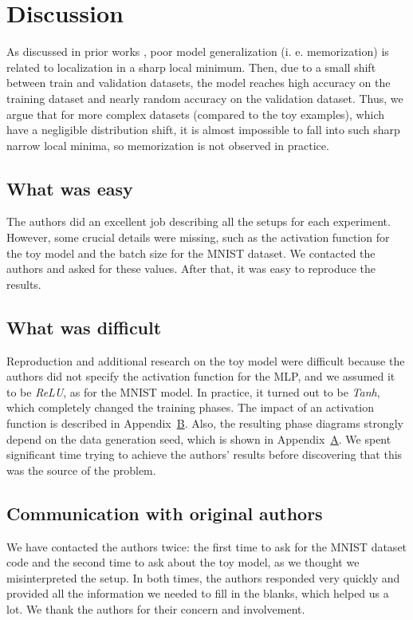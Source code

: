 \section{Discussion}

As discussed in prior works \cite{sharp_minima, entropy_sgd}, poor model generalization (i. e. memorization) is related to localization in a sharp local minimum. Then, due to a small shift between train and validation datasets, the model reaches high accuracy on the training dataset and nearly random accuracy on the validation dataset. Thus, we argue that for more complex datasets (compared to the toy examples), which have a negligible distribution shift, it is almost impossible to fall into such sharp narrow local minima, so memorization is not observed in practice.

\subsection{What was easy}

The authors did an excellent job describing all the setups for each experiment. However, some crucial details were missing, such as the activation function for the toy model and the batch size for the MNIST dataset. We contacted the authors and asked for these values. After that, it was easy to reproduce the results.

\subsection{What was difficult}

Reproduction and additional research on the toy model were difficult because the authors did not specify the activation function for the MLP, and we assumed it to be \emph{ReLU}, as for the MNIST model. In practice, it turned out to be \emph{Tanh}, which completely changed the training phases. The impact of an activation function is described in Appendix~\hyperref[app:B]{B}. Also, the resulting phase diagrams strongly depend on the data generation seed, which is shown in Appendix~\hyperref[app:A]{A}. We spent significant time trying to achieve the authors' results before discovering that this was the source of the problem.

\subsection{Communication with original authors}

We have contacted the authors twice: the first time to ask for the MNIST dataset code and the second time to ask about the toy model, as we thought we misinterpreted the setup. In both times, the authors responded very quickly and provided all the information we needed to fill in the blanks, which helped us a lot. We thank the authors for their concern and involvement.

